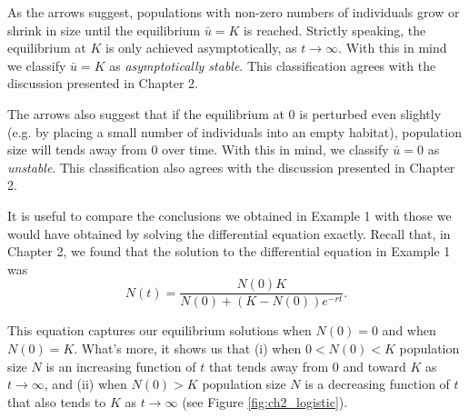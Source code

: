 \documentclass[../book.tex]{subfiles}
\begin{document}
\begin{solution}
As the arrows suggest, populations with non-zero numbers of individuals grow or shrink in size until the equilibrium \(\bar u=K\) is reached. Strictly speaking, the equilibrium at \(K\) is only achieved asymptotically, as \(t\to \infty\). With this in mind we classify \(\bar u=K\) as {\it asymptotically stable}. This classification agrees with the discussion presented in Chapter 2.

The arrows also suggest that if the equilibrium at \(0\) is perturbed even slightly (e.g. by placing a small number of individuals into an empty habitat), population size will tends away from \(0\) over time. With this in mind, we classify \(\bar u=0\) as {\it unstable}. This classification also agrees with the discussion presented in Chapter 2.
\end{solution}

It is useful to compare the conclusions we obtained in Example 1 with those we would have obtained by solving the differential equation exactly. Recall that, in Chapter 2, we found that the  solution to the differential equation in Example 1 was
\begin{equation}\label{eq:inexact-1}
N(t)= \dfrac{N(0) K}{N(0) + (K  - N(0)) e^{-rt}}.
\end{equation}

This equation captures our equilibrium solutions when \(N(0)=0\) and when \(N(0)=K\). What's more, it shows us that (i) when \(0 < N(0) < K\) population size \(N\) is an increasing function of \(t\) that tends away from \(0\) and toward \(K\) as \(t\to \infty\), and (ii) when \(N(0)>K\) population size \(N\) is a decreasing function of \(t\) that also tends to \(K\) as \(t \to \infty\) (see Figure \ref{fig:ch2_logistic}).
\end{document}
